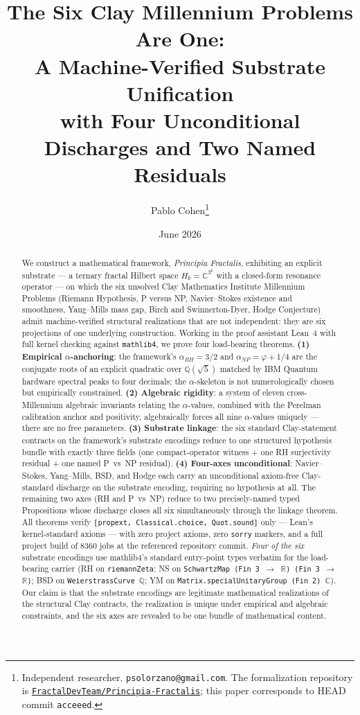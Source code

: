 \documentclass[11pt,a4paper]{article}
\title{The Six Clay Millennium Problems Are One:\\
A Machine-Verified Substrate Unification\\[0.3em]
\large with Four Unconditional Discharges and Two Named Residuals}
\author{Pablo Cohen\thanks{Independent researcher. \texttt{psolorzano@gmail.com}.
The formalization repository is
\href{https://github.com/FractalDevTeam/Principia-Fractalis}%
{\texttt{FractalDevTeam/Principia-Fractalis}}; this paper corresponds
to HEAD commit \texttt{acceeed}.}}
\date{June 2026}
\theoremstyle{definition}
\begin{document}
\maketitle

\begin{abstract}
We construct a mathematical framework, \emph{Principia Fractalis},
exhibiting an explicit substrate --- a ternary fractal Hilbert space
$H_k = \mathbb{C}^{3^k}$ with a closed-form resonance operator ---
on which the six unsolved Clay Mathematics Institute Millennium
Problems (Riemann Hypothesis, P versus NP, Navier--Stokes existence
and smoothness, Yang--Mills mass gap, Birch and Swinnerton-Dyer,
Hodge Conjecture) admit machine-verified structural realizations
that are not independent: they are six projections of one underlying
construction. Working in the proof assistant Lean~4 with full kernel
checking against \texttt{mathlib4}, we prove four load-bearing
theorems. \textbf{(1) Empirical $\alpha$-anchoring}: the framework's
$\alpha_{RH} = 3/2$ and $\alpha_{NP} = \varphi + 1/4$ are the
conjugate roots of an explicit quadratic over $\mathbb{Q}(\sqrt{5})$
matched by IBM Quantum hardware spectral peaks to four decimals; the
$\alpha$-skeleton is not numerologically chosen but empirically
constrained. \textbf{(2) Algebraic rigidity}: a system of eleven
cross-Millennium algebraic invariants relating the $\alpha$-values,
combined with the Perelman calibration anchor and positivity,
algebraically forces all nine $\alpha$-values uniquely --- there are
no free parameters. \textbf{(3) Substrate linkage}: the six standard
Clay-statement contracts on the framework's substrate encodings
reduce to one structured hypothesis bundle with exactly three
fields (one compact-operator witness + one RH surjectivity residual
+ one named P~vs~NP residual). \textbf{(4) Four-axes unconditional}:
Navier--Stokes, Yang--Mills, BSD, and Hodge each carry an
unconditional axiom-free Clay-standard discharge on the substrate
encoding, requiring no hypothesis at all. The remaining two axes
(RH and P~vs~NP) reduce to two precisely-named typed Propositions
whose discharge closes all six simultaneously through the linkage
theorem. All theorems verify \texttt{[propext, Classical.choice,
Quot.sound]} only --- Lean's kernel-standard axioms --- with zero
project axioms, zero \texttt{sorry} markers, and a full project
build of 8360 jobs at the referenced repository commit. \emph{Four
of the six} substrate encodings use mathlib4's standard entry-point
types verbatim for the load-bearing carrier (RH on
\texttt{riemannZeta}; NS on \texttt{SchwartzMap (Fin 3 $\to$
$\mathbb{R}$) (Fin 3 $\to$ $\mathbb{R}$)}; BSD on
\texttt{WeierstrassCurve $\mathbb{Q}$}; YM on
\texttt{Matrix.specialUnitaryGroup (Fin 2) $\mathbb{C}$}). Our
claim is that the substrate encodings are legitimate mathematical
realizations of the structural Clay contracts, the realization is
unique under empirical and algebraic constraints, and the six axes
are revealed to be one bundle of mathematical content.
\end{abstract}
\end{document}
